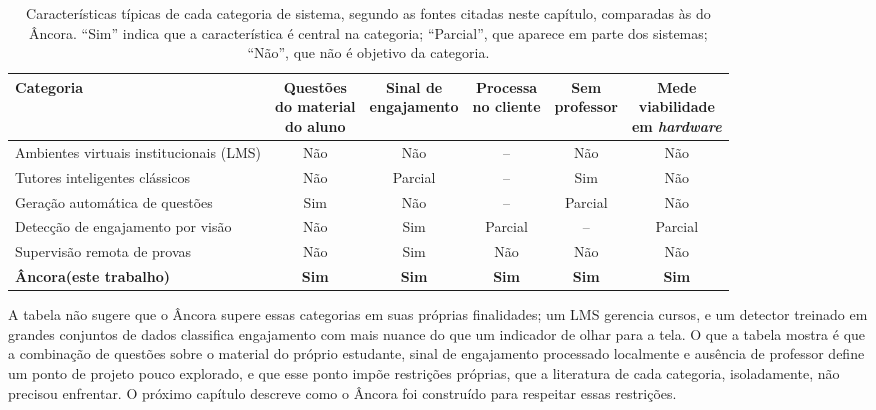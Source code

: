 \documentclass[portuguese,oneside]{tcc}
\newcommand{\ferramenta}{Âncora\xspace}
\newcommand{\estr}[1]{\emph{#1}}
\begin{document}
\begin{table}[htbp]
\centering
\caption{Características típicas de cada categoria de sistema, segundo as fontes citadas neste capítulo, comparadas às do \ferramenta. ``Sim'' indica que a característica é central na categoria; ``Parcial'', que aparece em parte dos sistemas; ``Não'', que não é objetivo da categoria.}
\label{tab:posicionamento}
\small
\begin{tabularx}{\textwidth}{>{\raggedright\arraybackslash}X ccccc}
\toprule
Categoria & \makecell{Questões\\do material\\do aluno} & \makecell{Sinal de\\engajamento} & \makecell{Processa\\no cliente} & \makecell{Sem\\professor} & \makecell{Mede\\viabilidade\\em \estr{hardware}} \\
\midrule
Ambientes virtuais institucionais (LMS) & Não & Não & -- & Não & Não \\
Tutores inteligentes clássicos & Não & Parcial & -- & Sim & Não \\
Geração automática de questões & Sim & Não & -- & Parcial & Não \\
Detecção de engajamento por visão & Não & Sim & Parcial & -- & Parcial \\
Supervisão remota de provas & Não & Sim & Não & Não & Não \\
\textbf{\ferramenta (este trabalho)} & \textbf{Sim} & \textbf{Sim} & \textbf{Sim} & \textbf{Sim} & \textbf{Sim} \\
\bottomrule
\end{tabularx}
\end{table}

A tabela não sugere que o \ferramenta supere essas categorias em suas próprias finalidades; um LMS gerencia cursos, e um detector treinado em grandes conjuntos de dados classifica engajamento com mais nuance do que um indicador de olhar para a tela. O que a tabela mostra é que a combinação de questões sobre o material do próprio estudante, sinal de engajamento processado localmente e ausência de professor define um ponto de projeto pouco explorado, e que esse ponto impõe restrições próprias, que a literatura de cada categoria, isoladamente, não precisou enfrentar. O próximo capítulo descreve como o \ferramenta foi construído para respeitar essas restrições.
\end{document}
